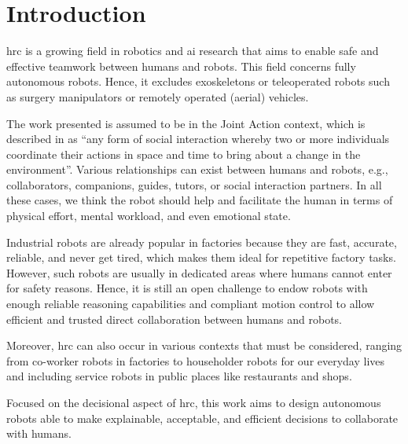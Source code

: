 \chapter*{Introduction}

\newcommand{\mysection}[1]{%
    \section*{#1}%
    \addcontentsline{toc}{section}{#1}%
    \markright{#1}%
}


\minitoc

\acrfull{hrc} is a growing field in robotics and \acrfull{ai} research that aims to enable safe and effective teamwork between humans and robots.
This field concerns fully autonomous robots. Hence, it excludes exoskeletons or teleoperated robots such as surgery manipulators or remotely operated (aerial) vehicles. 

The work presented is assumed to be in the Joint Action context, which is described in \cite{sebanz_joint_2006} as ``any form of social interaction whereby two or more individuals coordinate their actions in space and time to bring about a change in the environment''. Various relationships can exist between humans and robots, e.g., collaborators, companions, guides, tutors, or social interaction partners. In all these cases, we think the robot should help and facilitate the human in terms of physical effort, mental workload, and even emotional state.

Industrial robots are already popular in factories because they are fast, accurate, reliable, and never get tired, which makes them ideal for repetitive factory tasks. 
However, such robots are usually in dedicated areas where humans cannot enter for safety reasons. 
Hence, it is still an open challenge to endow robots with enough reliable reasoning capabilities and compliant motion control to allow efficient and trusted direct collaboration between humans and robots. 

Moreover, \acrshort{hrc} can also occur in various contexts that must be considered, ranging from co-worker robots in factories to householder robots for our everyday lives and including service robots in public places like restaurants and shops.

Focused on the decisional aspect of \acrshort{hrc}, this work aims to design autonomous robots able to make explainable, acceptable, and efficient decisions to collaborate with humans. 

